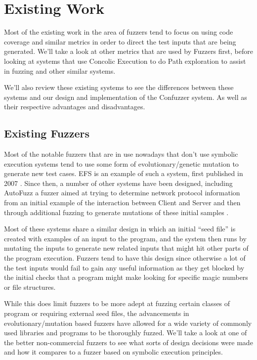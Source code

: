 \chapter{Existing Work}
Most of the existing work in the area of fuzzers tend to focus on using code
coverage and similar metrics in order to direct the test inputs that are being
generated. We'll take a look at other metrics that are used by Fuzzers first,
before looking at systems that use Concolic Execution to do Path exploration to
assist in fuzzing and other similar systems.

We'll also review these existing systems to see the differences between these
systems and our design and implementation of the Confuzzer system. As well as
their respective advantages and disadvantages.

\section{Existing Fuzzers}
Most of the notable fuzzers that are in use nowadays that don't use symbolic
execution systems tend to use some form of evolutionary/genetic mutation to
generate new test cases. EFS is an example of such a system, first published in
2007 \cite{evolfuzzing}. Since then, a number of other systems have been
designed, including AutoFuzz a fuzzer aimed at trying to determine network
protocol information from an initial example of the interaction between Client
and Server and then through additional fuzzing to generate mutations of these
initial samples \cite{autofuzz}.

Most of these systems share a similar design in which an initial ``seed file''
is created with examples of an input to the program, and the system then runs by
mutating the inputs to generate new related inputs that might hit other parts of
the program execution. Fuzzers tend to have this design since otherwise a lot of
the test inputs would fail to gain any useful information as they get blocked by
the initial checks that a program might make looking for specific magic numbers
or file structures.

While this does limit fuzzers to be more adept at fuzzing certain classes of
program or requiring external seed files, the advancements in
evolutionary/mutation based fuzzers have allowed for a wide variety of commonly
used libraries and programs to be thoroughly fuzzed. We'll take a look at one of
the better non-commercial fuzzers to see what sorts of design decisions were
made and how it compares to a fuzzer based on symbolic execution principles.

